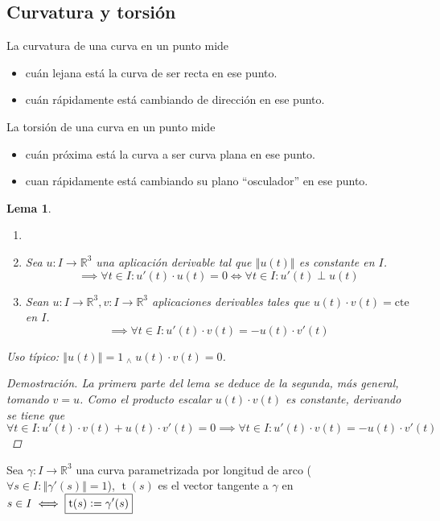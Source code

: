 \documentclass[12pt]{article}
\theoremstyle{plain}
\newtheorem{lem}{Lema}[subsection]
\newenvironment{dem}[1][]{%
	\begin{adjustwidth}{1cm}{0cm} \begin{proof}[Demostración\ifx\relax#1\relax\else{ (#1)}\fi]
}{\end{proof}\end{adjustwidth}}
\newcommand{\R}{\mathbb{R}}
\newcommand{\norm}[1]{\left\Vert#1\right\Vert}
\newcommand{\appl}[3]{#1 \colon #2 \longrightarrow #3}
\newcommand{\we}{\; _{\wedge} \;}
\newcommand{\tex}[1]{\text{#1}}
\newcommand{\defeq}{\vcentcolon=}
\newcommand{\tngnt}{\operatorname{t}}
\renewcommand{\norm}[1]{\left\Vert#1\right\Vert}
\begin{document}
\subsection{Curvatura y torsión}
La curvatura de una curva en un punto mide
\begin{itemize}[topsep=1pt, itemsep=1pt,parsep=3pt]
	\item cuán lejana está la curva de ser recta en ese punto.
	\item cuán rápidamente está cambiando de dirección en ese punto.
\end{itemize}
La torsión de una curva en un punto mide
\begin{itemize}[topsep=1pt, itemsep=1pt,parsep=3pt]
	\item cuán próxima está la curva a ser curva plana en ese punto.
	\item cuan rápidamente está cambiando su plano “osculador” en ese punto.
\end{itemize}
\vspace{0.4cm}
\begin{lem}
	\begin{enumerate}[topsep=0pt, itemsep=1pt,parsep=3pt]
		\item[] 
		\item Sea $\appl{u}{I}{\R^3}$ una aplicación derivable tal que $\norm{u(t)}$ es constante en $I$.
		\[\implies \forall t \in I : u'(t)\cdot u(t)=0 \iff \forall t \in I : u'(t) \perp u(t)\]
		\item Sean $\appl{u}{I}{\R^3}, \appl{v}{I}{\R^3}$ aplicaciones derivables tales que $u(t)\cdot v(t)=\tex{cte}$ en $I$.
		\[\implies \forall t \in I : u'(t) \cdot v(t)=-u(t)\cdot v'(t)\]
	\end{enumerate}
	Uso típico: $\norm{u(t)}=1 \we u(t)\cdot v(t)=0$.
	\begin{dem}
		La primera parte del lema se deduce de la segunda, más general, tomando $v=u$.
		Como el producto escalar $u(t)\cdot v(t)$ es constante, derivando se tiene que
		\[\forall t \in I : u'(t)\cdot v(t) + u(t)\cdot v'(t) = 0 \implies \forall t \in I : u'(t)\cdot v(t) = - u(t)\cdot v'(t)\]
	\end{dem}
\end{lem}

\begin{defn}
	Sea $\appl{\gamma}{I}{\R^3}$ una curva parametrizada por longitud de arco ($\forall s \in I : \norm{\gamma'(s)}=1$), $\tngnt(s)$ es el vector tangente a $\gamma$ en $s\in I \iff \boxed{\tngnt(s)\defeq \gamma'(s)}$
\end{defn}
\end{document}
